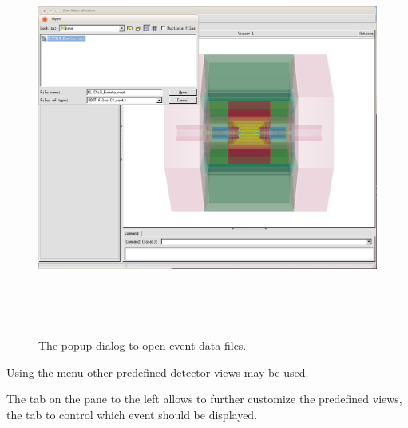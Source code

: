 \documentclass[10pt,a4paper]{article}
\begin{document}
\begin{figure}[h]
  \begin{center}
    \includegraphics[height=130mm] {DDEve_4}
    \caption{The popup dialog to open event data files.}
    \label{fig:DDEve_4}
  \end{center}
\end{figure}
Using the  menu other predefined detector views may be used.

\newpage
\noindent 
The  tab on the pane to the left allows to further customize the 
predefined views, the  tab to control which event should 
be displayed.
\end{document}
